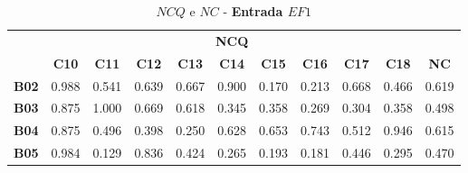\begin{table}[htbp]
	\centering
	\caption{$NCQ$ e $NC$ - \textbf{Entrada $EF1$}}
	\begin{tabular}{|c|ccccccccc|c|}
		\hline
		\rowcolor[HTML]{D0CECE} 
		\cellcolor[HTML]{D0CECE} & \multicolumn{9}{c|}{\cellcolor[HTML]{D0CECE}\textbf{NCQ}} & \cellcolor[HTML]{D0CECE} \\ \cline{2-10}
		\rowcolor[HTML]{D0CECE} 
		\multirow{-2}{*}{\cellcolor[HTML]{D0CECE}\textbf{Part.}} & \multicolumn{1}{c|}{\cellcolor[HTML]{D0CECE}\textbf{C10}} & \multicolumn{1}{c|}{\cellcolor[HTML]{D0CECE}\textbf{C11}} & \multicolumn{1}{c|}{\cellcolor[HTML]{D0CECE}\textbf{C12}} & \multicolumn{1}{c|}{\cellcolor[HTML]{D0CECE}\textbf{C13}} & \multicolumn{1}{c|}{\cellcolor[HTML]{D0CECE}\textbf{C14}} & \multicolumn{1}{c|}{\cellcolor[HTML]{D0CECE}\textbf{C15}} & \multicolumn{1}{c|}{\cellcolor[HTML]{D0CECE}\textbf{C16}} & \multicolumn{1}{c|}{\cellcolor[HTML]{D0CECE}\textbf{C17}} & \textbf{C18} & \multirow{-2}{*}{\cellcolor[HTML]{D0CECE}\textbf{NC}} \\ \hline
		\textbf{B02} & \multicolumn{1}{c|}{0.988} & \multicolumn{1}{c|}{0.541} & \multicolumn{1}{c|}{0.639} & \multicolumn{1}{c|}{0.667} & \multicolumn{1}{c|}{0.900} & \multicolumn{1}{c|}{0.170} & \multicolumn{1}{c|}{0.213} & \multicolumn{1}{c|}{0.668} & 0.466 & 0.619 \\ \hline
		\rowcolor[HTML]{F2F2F2} 
		\textbf{B03} & \multicolumn{1}{c|}{\cellcolor[HTML]{F2F2F2}0.875} & \multicolumn{1}{c|}{\cellcolor[HTML]{F2F2F2}1.000} & \multicolumn{1}{c|}{\cellcolor[HTML]{F2F2F2}0.669} & \multicolumn{1}{c|}{\cellcolor[HTML]{F2F2F2}0.618} & \multicolumn{1}{c|}{\cellcolor[HTML]{F2F2F2}0.345} & \multicolumn{1}{c|}{\cellcolor[HTML]{F2F2F2}0.358} & \multicolumn{1}{c|}{\cellcolor[HTML]{F2F2F2}0.269} & \multicolumn{1}{c|}{\cellcolor[HTML]{F2F2F2}0.304} & 0.358 & 0.498 \\ \hline
		\textbf{B04} & \multicolumn{1}{c|}{0.875} & \multicolumn{1}{c|}{0.496} & \multicolumn{1}{c|}{0.398} & \multicolumn{1}{c|}{0.250} & \multicolumn{1}{c|}{0.628} & \multicolumn{1}{c|}{0.653} & \multicolumn{1}{c|}{0.743} & \multicolumn{1}{c|}{0.512} & 0.946 & 0.615 \\ \hline
		\rowcolor[HTML]{F2F2F2} 
		\textbf{B05} & \multicolumn{1}{c|}{\cellcolor[HTML]{F2F2F2}0.984} & \multicolumn{1}{c|}{\cellcolor[HTML]{F2F2F2}0.129} & \multicolumn{1}{c|}{\cellcolor[HTML]{F2F2F2}0.836} & \multicolumn{1}{c|}{\cellcolor[HTML]{F2F2F2}0.424} & \multicolumn{1}{c|}{\cellcolor[HTML]{F2F2F2}0.265} & \multicolumn{1}{c|}{\cellcolor[HTML]{F2F2F2}0.193} & \multicolumn{1}{c|}{\cellcolor[HTML]{F2F2F2}0.181} & \multicolumn{1}{c|}{\cellcolor[HTML]{F2F2F2}0.446} & 0.295 & 0.470 \\ \hline

\end{tabular}
\end{table}
